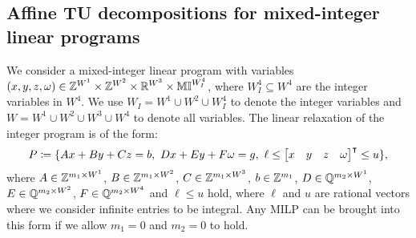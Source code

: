 \documentclass[pdflatex,sn-mathphys-num]{sn-jnl}%
\theoremstyle{thmstyleone}%
\theoremstyle{thmstylethree}%
\theoremstyle{thmstyletwo}%
\begin{document}
\subsection{Affine TU decompositions for mixed-integer linear programs}

We consider a mixed-integer linear program with variables $(x,y,z,\omega) \in \mathbb{Z}^{W^1} \times \mathbb{Z}^{W^2} \times \mathbb{R}^{W^3} \times \mathbb{MI}^{W^4_I}$, where $W^4_I\subseteq W^4$ are the integer variables in $W^4$. We use $W_I = W^1 \cup W^2 \cup W^4_I$ to denote the integer variables and $W = W^1\cup W^2 \cup W^3 \cup W^4$ to denote all variables. 
The linear relaxation of the integer program is of the form:
\begin{align*}
    P \coloneqq \{A x + B y + C z = b,~ D x + E y + F \omega = g,~ \ell \leq \transpose{\begin{bmatrix}
        x &
        y &
        z &
        \omega
    \end{bmatrix}} \leq u \},
\end{align*} where $A \in \mathbb{Z}^{m_1\times W^1}$, $B\in \mathbb{Z}^{m_1\times W^2}$, $C\in \mathbb{Z}^{m_1\times W^3}$, $b\in \mathbb{Z}^{m_1}$, $D\in \mathbb{Q}^{m_2\times W^1}$, $E\in \mathbb{Q}^{m_2\times W^2}$, $F\in \mathbb{Q}^{m_2\times W^4}$ and $\ell \leq u$ hold, where $\ell$ and $u$ are rational vectors where we consider infinite entries to be integral. Any MILP can be brought into this form if we allow $m_1=0$ and $m_2=0$ to hold. 
\end{document}
